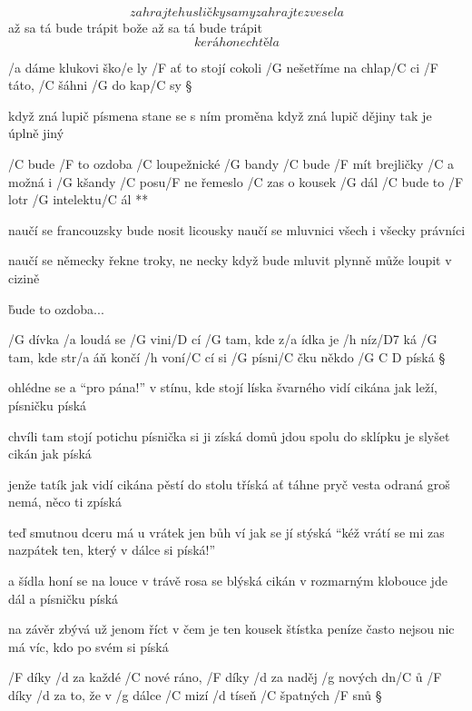 \[ zahrajte husličky samy
zahrajte zvesela \]
až sa tá bude trápit
bože až sa tá bude trápit
\[ kerá ho nechtěla \]




/a dáme klukovi ško/e ly
/F ať to stojí cokoli
/G nešetříme na chlap/C ci
/F táto, /C šáhni /G do kap/C sy \S

když zná lupič písmena
stane se s ním proměna
když zná lupič dějiny
tak je úplně jiný

\R  /C bude /F to ozdoba /C loupežnické /G bandy
    /C bude /F mít brejličky /C a možná i /G kšandy
    /C posu/F ne řemeslo /C zas o kousek /G dál
    /C bude to /F lotr /G intelektu/C ál **

naučí se francouzsky
bude nosit licousky
naučí se mluvnici
všech i všecky právníci \s

naučí se německy
řekne troky, ne necky
když bude mluvit plynně
může loupit v cizině

\r bude to ozdoba...




/G dívka /a loudá se /G vini/D cí
/G tam, kde z/a ídka je /h níz/D7 ká
/G tam, kde str/a áň končí /h voní/C cí
si /G písni/C čku někdo /{G C D} píská \S

ohlédne se a ``pro pána!''
v stínu, kde stojí líska
švarného vidí cikána
jak leží, písničku píská \s

chvíli tam stojí potichu
písnička si ji získá
domů jdou spolu do sklípku
je slyšet cikán jak píská \s

jenže tatík jak vidí cikána
pěstí do stolu tříská
ať táhne pryč vesta odraná
groš nemá, něco ti zpíská \s

teď smutnou dceru má u vrátek
jen bůh ví jak se jí stýská
``kéž vrátí se mi zas nazpátek
ten, který v dálce si píská!''\s

a šídla honí se na louce
v trávě rosa se blýská
cikán v rozmarným klobouce
jde dál a písničku píská \s

na závěr zbývá už jenom říct
v čem je ten kousek štístka
peníze často nejsou nic
má víc, kdo po svém si píská




/F díky /d za každé /C nové ráno, /F díky /d za naděj /g nových dn/C ů
/F díky /d za to, že v /g dálce /C mizí /d tíseň /C špatných /F snů \S

